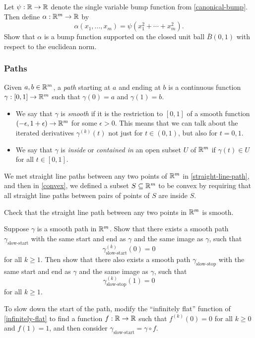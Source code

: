 \begin{exercise} \label{multivariable-bump-round-support}
	Let $\psi : \mathbb{R} \to \mathbb{R}$ denote the single variable bump function from \cref{canonical-bump}. Then define $\alpha : \mathbb{R}^m \to \mathbb{R}$ by
	\[ \alpha(x_1, \dotsc, x_m) = \psi(x_1^2 + \dotsb + x_m^2). \]
	Show that $\alpha$ is a bump function supported on the closed unit ball $\bar{B}(0,1)$ with respect to the euclidean norm.  
\end{exercise}

\subsubsection*{Paths} \label{paths-multi}

\begin{definition}[Paths]
	Given $a, b \in \mathbb{R}^m$, a \emph{path} starting at $a$ and ending at $b$ is a continuous function $\gamma : [0, 1] \to \mathbb{R}^m$ such that $\gamma(0) = a$ and $\gamma(1) = b$. 
	\begin{itemize}
		\item We say that $\gamma$ is \emph{smooth} if it is the restriction to $[0,1]$ of a smooth function $(-\epsilon, 1+\epsilon) \to \mathbb{R}^m$ for some $\epsilon > 0$. This means that we can talk about the iterated derivatives $\gamma^{(k)}(t)$ not just for $t \in (0,1)$, but also for $t = 0, 1$. 
		\item We say that $\gamma$ is \emph{inside} or \emph{contained in} an open subset $U$ of $\mathbb{R}^m$ if $\gamma(t) \in U$ for all $t \in [0,1]$.
	\end{itemize}
\end{definition}

We met straight line paths between any two points of $\mathbb{R}^m$ in \cref{straight-line-path}, and then in \cref{convex}, we defined a subset $S \subseteq \mathbb{R}^m$ to be convex by requiring that all straight line paths between pairs of points of $S$ are inside $S$. 

\begin{exercise}
	Check that the straight line path between any two points in $\mathbb{R}^m$ is smooth. 
\end{exercise} 

\begin{exercise} \label{slowing-down-paths}
	Suppose $\gamma$ is a smooth path in $\mathbb{R}^m$. Show that there exists a smooth path $\gamma_{\text{slow-start}}$ with the same start and end as $\gamma$ and the same image as $\gamma$, such that 
	\[ \gamma_{\text{slow-start}}^{(k)}(0) = 0 \]
	for all $k \geq 1$. Then show that there also exists a smooth path $\gamma_{\text{slow-stop}}$ with the same start and end as $\gamma$ and the same image as $\gamma$, such that 
	\[ \gamma_{\text{slow-stop}}^{(k)}(1) = 0 \]
	for all $k \geq 1$. 
	\begin{hint}
		To slow down the start of the path, modify the ``infinitely flat'' function of  \cref{infinitely-flat} to find a function $f : \mathbb{R} \to \mathbb{R}$ such that $f^{(k)}(0) = 0$ for all $k \geq 0$ and $f(1) = 1$, and then consider $\gamma_{\text{slow-start}} = \gamma \circ f$. 
	\end{hint}
\end{exercise}

